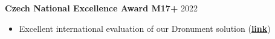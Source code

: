 \documentclass[12pt,a4paper]{article}
\newcommand\Colorhreff[3][reff]{\href{#2}{\color{#1}#3}}
\begin{document}
\begin{paracol}{2}
\vspace{0.2cm}
\noindent
\textbf{Czech National Excellence Award M17+} \hfill 2022
\begin{itemize}
  \item Excellent international evaluation of our Dronument solution (\Colorhreff{https://mrs.fel.cvut.cz/dg18p02ovv069-fvz}{\textbf{link}})
\end{itemize}


\end{paracol}
\end{document}
